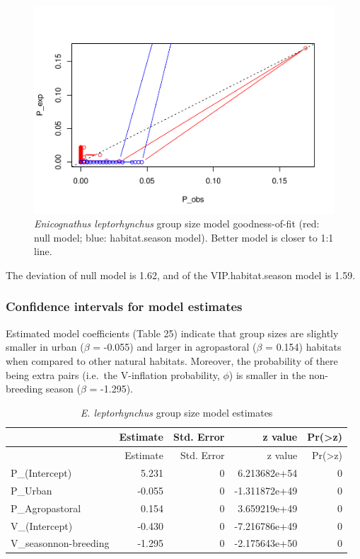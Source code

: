 \documentclass[]{article}
\begin{document}
\begin{figure}[H]
\includegraphics{Patagonia_parrots_density_analysis_files/figure-latex/unnamed-chunk-33-1} \caption{\textit{Enicognathus leptorhynchus} group size model goodness-of-fit (red: null model; blue: habitat.season model). Better model is closer to 1:1 line.}\label{fig:unnamed-chunk-33}
\end{figure}

The deviation of null model is 1.62, and of the VIP.habitat.season model
is 1.59.

\subsubsection{Confidence intervals for model
estimates}\label{confidence-intervals-for-model-estimates-1}

Estimated model coefficients (Table 25) indicate that group sizes are
slightly smaller in urban (\(\beta\) = -0.055) and larger in
agropastoral (\(\beta\) = 0.154) habitats when compared to other natural
habitats. Moreover, the probability of there being extra pairs (i.e.~the
V-inflation probability, \(\phi\)) is smaller in the non-breeding season
(\(\beta\) = -1.295).

\begin{longtable}[]{@{}lrrrr@{}}
\caption{\textit{E. leptorhynchus} group size model
estimates}\tabularnewline
\toprule
& Estimate & Std. Error & z value &
Pr(\textgreater{}\textbar{}z\textbar{})\tabularnewline
\midrule
\endfirsthead
\toprule
& Estimate & Std. Error & z value &
Pr(\textgreater{}\textbar{}z\textbar{})\tabularnewline
\midrule
\endhead
P\_(Intercept) & 5.231 & 0 & 6.213682e+54 & 0\tabularnewline
P\_Urban & -0.055 & 0 & -1.311872e+49 & 0\tabularnewline
P\_Agropastoral & 0.154 & 0 & 3.659219e+49 & 0\tabularnewline
V\_(Intercept) & -0.430 & 0 & -7.216786e+49 & 0\tabularnewline
V\_seasonnon-breeding & -1.295 & 0 & -2.175643e+50 & 0\tabularnewline
\bottomrule
\end{longtable}
\end{document}

